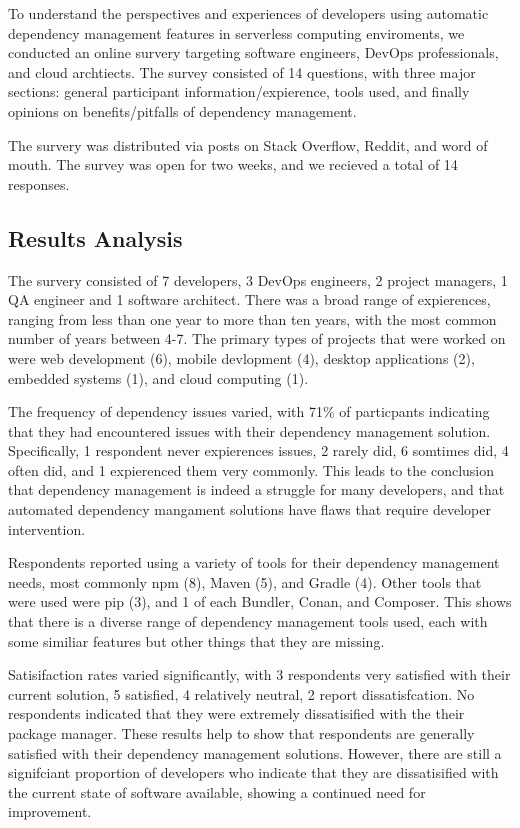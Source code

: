\documentclass[sigconf]{acmart}
\begin{document}
To understand the perspectives and experiences of developers using automatic dependency management features in serverless computing enviroments, we conducted an online survery targeting software engineers, DevOps professionals, and cloud archtiects. The survey consisted of 14 questions, with three major sections: general participant information/expierence, tools used, and finally opinions on benefits/pitfalls of dependency management.

The survery was distributed via posts on Stack Overflow, Reddit, and word of mouth. The survey was open for two weeks, and we recieved a total of 14 responses. 

\subsection{Results Analysis}

The survery consisted of 7 developers, 3 DevOps engineers, 2 project managers, 1 QA engineer and 1 software architect. There was a broad range of expierences, ranging from less than one year to more than ten years, with the most common number of years between 4-7. The primary types of projects that were worked on were web development (6), mobile devlopment (4), desktop applications (2), embedded systems (1), and cloud computing (1). 

The frequency of dependency issues varied, with 71\% of particpants indicating that they had encountered issues with their dependency management solution. Specifically, 1 respondent never expierences issues, 2 rarely did, 6 somtimes did, 4 often did, and 1 expierenced them very commonly. This leads to the conclusion that dependency management is indeed a struggle for many developers, and that automated dependency mangament solutions have flaws that require developer intervention.

Respondents reported using a variety of tools for their dependency management needs, most commonly npm (8), Maven (5), and Gradle (4). Other tools that were used were pip (3), and 1 of each Bundler, Conan, and Composer. This shows that there is a diverse range of dependency management tools used, each with some similiar features but other things that they are missing. 

Satisifaction rates varied significantly, with 3 respondents very satisfied with their current solution, 5 satisfied, 4 relatively neutral, 2 report dissatisfcation. No respondents indicated that they were extremely dissatisified with the their package manager. These results help to show that respondents are generally satisfied with their dependency management solutions. However, there are still a signifciant proportion of developers who indicate that they are dissatisified with the current state of software available, showing a continued need for improvement. 
\end{document}
